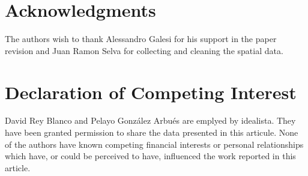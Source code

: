 \documentclass[times,final]{elsarticle}
\begin{document}
\section*{Acknowledgments}

The authors wish to thank Alessandro Galesi for his support in the paper revision and Juan Ramon Selva for collecting and cleaning the spatial data.


\section*{Declaration of Competing Interest}

David Rey Blanco and Pelayo González Arbués are emplyed by idealista. They have been granted permission to share the data presented in this articule. None of the authors have known competing financial interests or personal relationships which have, or could be perceived to have, influenced the work reported in this article.
\end{document}
